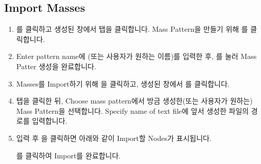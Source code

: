 \documentclass[a4paper,11pt,korean,openany,oneside]{sphinxmanual}
\begin{document}
\subsection{Import Masses}
\label{\detokenize{3_import:import-masses}}
\begin{sphinxShadowBox}
\begin{enumerate}
%
\item {} 
\sphinxAtStartPar
{}를 클릭하고 생성된 창에서  탭을 클릭합니다.
Mass Pattern을 만들기 위해 를 클릭합니다.

\item {} 
\sphinxAtStartPar
Enter pattern name에 (또는 사용자가 원하는 이름)를 입력한 후, 를 눌러 Mass Patter 생성을 완료합니다.

\begin{center}
\noindent{}
\end{center}

\item {} 
\sphinxAtStartPar
Masses를 Import하기 위해 을 클릭하고, 생성된 창에서 를 클릭합니다.

\item {} 
\sphinxAtStartPar
{} 탭을 클릭한 뒤, Choose mass pattern에서 방금 생성한(또는 사용자가 원하는) Mass Pattern을 선택합니다.
Specify name of text file에 앞서 생성한  파일의 경로를 입력합니다.

\newpage

\begin{center}
\noindent{}
\end{center}

\newpage

\item {} 
\sphinxAtStartPar
입력 후  \sphinxhyphen{} 을 클릭하면 아래와 같이 Import할 Nodes가 표시됩니다.

\begin{center}
\noindent{}
\end{center}

\sphinxAtStartPar
{}를 클릭하여 Import를 완료합니다.

\end{enumerate}
\end{sphinxShadowBox}
\end{document}
